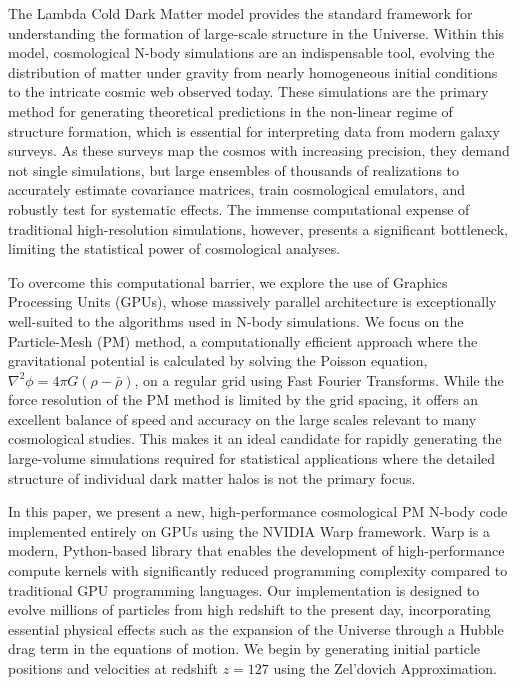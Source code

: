 \documentclass[]{article}
\begin{document}
The Lambda Cold Dark Matter model provides the standard framework for understanding the formation of large-scale structure in the Universe. Within this model, cosmological N-body simulations are an indispensable tool, evolving the distribution of matter under gravity from nearly homogeneous initial conditions to the intricate cosmic web observed today. These simulations are the primary method for generating theoretical predictions in the non-linear regime of structure formation, which is essential for interpreting data from modern galaxy surveys. As these surveys map the cosmos with increasing precision, they demand not single simulations, but large ensembles of thousands of realizations to accurately estimate covariance matrices, train cosmological emulators, and robustly test for systematic effects. The immense computational expense of traditional high-resolution simulations, however, presents a significant bottleneck, limiting the statistical power of cosmological analyses.

To overcome this computational barrier, we explore the use of Graphics Processing Units (GPUs), whose massively parallel architecture is exceptionally well-suited to the algorithms used in N-body simulations. We focus on the Particle-Mesh (PM) method, a computationally efficient approach where the gravitational potential is calculated by solving the Poisson equation, $\nabla^2 \phi = 4 \pi G (\rho - \bar{\rho})$, on a regular grid using Fast Fourier Transforms. While the force resolution of the PM method is limited by the grid spacing, it offers an excellent balance of speed and accuracy on the large scales relevant to many cosmological studies. This makes it an ideal candidate for rapidly generating the large-volume simulations required for statistical applications where the detailed structure of individual dark matter halos is not the primary focus.

In this paper, we present a new, high-performance cosmological PM N-body code implemented entirely on GPUs using the NVIDIA Warp framework. Warp is a modern, Python-based library that enables the development of high-performance compute kernels with significantly reduced programming complexity compared to traditional GPU programming languages. Our implementation is designed to evolve millions of particles from high redshift to the present day, incorporating essential physical effects such as the expansion of the Universe through a Hubble drag term in the equations of motion. We begin by generating initial particle positions and velocities at redshift $z=127$ using the Zel'dovich Approximation.
\end{document}
